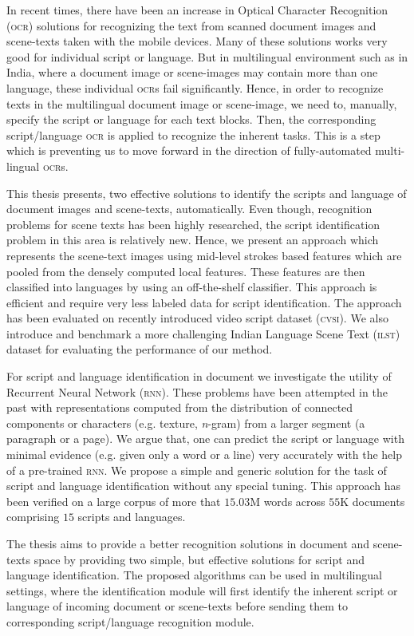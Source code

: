 In recent times, there have been an increase in Optical Character Recognition (\textsc{ocr}) solutions for recognizing the text from scanned document images and scene-texts taken with the mobile devices. Many of these solutions works very good for individual script or language. But in multilingual environment such as in India, where a document image or scene-images may contain more than one language, these individual \textsc{ocr}s fail significantly. Hence, in order to recognize texts in the multilingual document image or scene-image, we need to, manually, specify the script or language for each text blocks. Then, the corresponding script/language \textsc{ocr} is applied to recognize the inherent tasks. This is a step which is preventing us to move forward in the direction of fully-automated multi-lingual \textsc{ocr}s. 

This thesis presents, two effective solutions to identify the scripts and language of document images and scene-texts, automatically. Even though, recognition problems for scene texts has been highly researched, the script identification problem in this area is relatively new. Hence, we present an approach which represents the scene-text images using mid-level strokes based features which are pooled from the densely computed local features. These features are then classified into languages by using an off-the-shelf classifier. This approach is efficient and require very less labeled data for script identification. The approach has been evaluated on recently introduced video script dataset (\textsc{cvsi}). We also introduce and benchmark a more challenging Indian Language Scene Text (\textsc{ilst}) dataset for evaluating the performance of our method.

For script and language identification in document we investigate the utility of Recurrent Neural Network (\textsc{rnn}). These problems have been attempted in the past with representations computed from the distribution of connected components or characters (e.g. texture, \textit{n}-gram) from a larger segment (a paragraph or a page). We argue that, one can predict the script or language with minimal evidence (e.g. given only a word or a line) very accurately with the help of a pre-trained \textsc{rnn}. We propose a simple and generic solution for the task of script and language identification without any special tuning. This approach has been verified on a large corpus of more that $15.03$M words across $55$K documents comprising $15$ scripts and languages.

The thesis aims to provide a better recognition solutions in document and scene-texts space by providing two simple, but effective solutions for script and language identification. The proposed algorithms can be used in multilingual settings, where the identification module will first identify the inherent script or language of incoming document or scene-texts before sending them to corresponding script/language recognition module.




